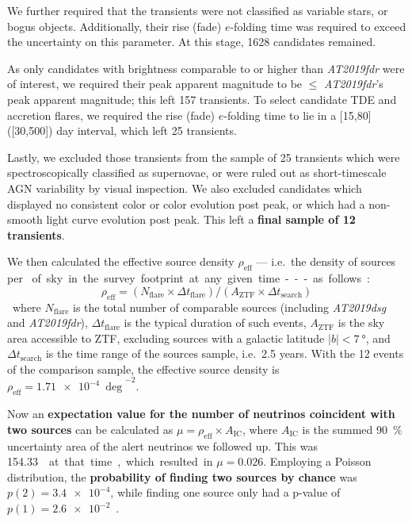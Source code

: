 We further required that the transients were not classified as variable stars, or bogus objects. Additionally, their rise (fade) $e$-folding time was required to exceed the uncertainty on this parameter. At this stage, 1628 candidates remained.

As only candidates with brightness comparable to or higher than \emph{AT2019fdr} were of interest, we required their peak apparent magnitude to be $\leq$ \emph{AT2019fdr}'s peak apparent magnitude; this left 157 transients. To select candidate TDE and accretion flares, we required the rise (fade) $e$-folding time to lie in a [15,80] ([30,500]) day interval, which left 25 transients.

Lastly, we excluded those transients from the sample of 25 transients which were spectroscopically classified as supernovae, or were ruled out as short-timescale AGN variability by visual inspection. We also excluded candidates which displayed no consistent color or color evolution post peak, or which had a non-smooth light curve evolution post peak. This left a \textbf{final sample of 12 transients}.

We then calculated the effective source density $\rho_\text{eff}$ --- i.e.\ the density of sources per \unit{\square\deg} of sky in the survey footprint at any given time --- as follows:

\begin{equation}
    \rho_\text{eff} = (N_\text{flare} \times \Delta t_\text{flare}) / (A_\text{ZTF}  \times \Delta t_\text{search})
\end{equation}
where $N_\text{flare}$ is the total number of comparable sources (including \emph{AT2019dsg} and \emph{AT2019fdr}), $\Delta t_\text{flare}$ is the typical duration of such events, $A_\text{ZTF}$ is the sky area accessible to ZTF, excluding sources with a galactic latitude $|b|<\SI{7}{\degree}$, and $\Delta t_\text{search}$ is the time range of the sources sample, i.e.\ 2.5 years. With the 12 events of the comparison sample, the effective source density is $\rho_\text{eff} = \SI{1.71e-4}{\deg}^{-2}$.

Now an \textbf{expectation value for the number of neutrinos coincident with two sources} can be calculated as $\mu=\rho_\text{eff}\times A_\text{IC}$, where $A_\text{IC}$ is the summed \SI{90}{\percent} uncertainty area of the alert neutrinos we followed up. This was \SI{154.33}{\square\deg} at that time, which resulted in $\mu=0.026$. Employing a Poisson distribution, the \textbf{probability of finding two sources by chance} was $p(2)=\num{3.4e-4}$, while finding one source only had a p-value of $p(1)=\num{2.6e-2}$~\cite{Reusch2022}.

